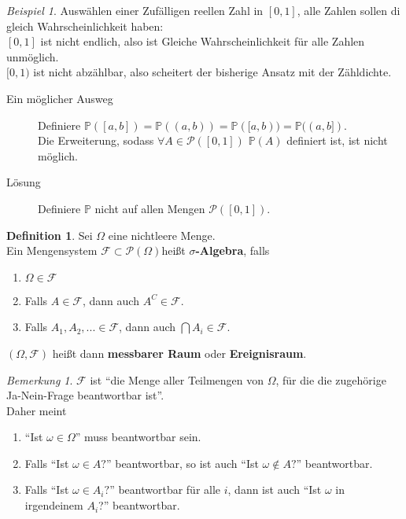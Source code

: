 \documentclass[10pt,a4paper]{article}
\newcommand{\Potset}{\mathscr P}
\newcommand{\Prb}{\mathbb P}
\theoremstyle{plain}
\theoremstyle{definition}
\newtheorem{definition}[theorem]{Definition}
\theoremstyle{remark}
\newtheorem{bem}[theorem]{Bemerkung}
\newtheorem{exm}[theorem]{Beispiel}
\begin{document}
	\begin{exm}
		Auswählen einer Zufälligen reellen Zahl in $[0,1]$, alle Zahlen sollen di gleich Wahrscheinlichkeit haben:\\
		$[0,1]$ ist nicht endlich, also ist Gleiche Wahrscheinlichkeit für alle Zahlen unmöglich.\\
		$[0,1)$ ist nicht abzählbar, also scheitert der bisherige Ansatz mit der Zähldichte.\\
		\begin{description}
			\item[Ein möglicher Ausweg]
			Definiere $\Prb([a,b])=\Prb((a,b))=\Prb([a,b))=\Prb((a,b])$.\\
			Die Erweiterung, sodass $\forall A\in\Potset([0,1])$ $\Prb(A)$ definiert ist, ist nicht möglich.
			\item[Lösung] Definiere $\Prb$ nicht auf allen Mengen $\Potset([0,1])$.
		\end{description}
	\end{exm}
	\begin{definition}
		Sei $\Omega$ eine nichtleere Menge.\\
		Ein Mengensystem $\mathscr F\subset \Potset(\Omega)$heißt \textbf{$\sigma$-Algebra}, falls
		\begin{enumerate}
			\item $\Omega\in\mathscr F$
			\item Falls $A\in\mathscr F$, dann auch $A^C\in\mathscr F$.
			\item Falls $A_1,A_2,...\in\mathscr F$, dann auch $\bigcap A_i\in\mathscr F$.
		\end{enumerate}
	$(\Omega,\mathscr F)$ heißt dann \textbf{messbarer Raum} oder \textbf{Ereignisraum}.
	\end{definition}

	\begin{bem}
		$\mathscr F$ ist ``die Menge aller Teilmengen von $\Omega$, für die die zugehörige Ja-Nein-Frage beantwortbar ist''.\\
		Daher meint
		\begin{enumerate}
			\item ``Ist $\omega\in\Omega$'' muss beantwortbar sein.
			\item Falls ``Ist $\omega\in A?$'' beantwortbar, so ist auch ``Ist $\omega\notin A?$'' beantwortbar.
			\item Falls ``Ist $\omega\in A_i?$'' beantwortbar für alle $i$, dann ist auch ``Ist $\omega$ in irgendeinem $A_i$?'' beantwortbar.
		\end{enumerate}
	\end{bem}
\end{document}
